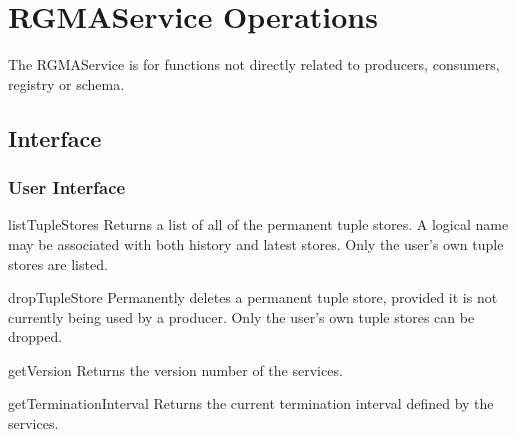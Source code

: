 \section{RGMAService Operations}\label{sec:Producer}

The RGMAService is for functions not directly related to producers, consumers,
registry or schema.

\subsection{Interface}

\subsubsection{User Interface}

\begin{method}{listTupleStores}
\desc Returns a list of all of the permanent tuple stores. A logical name may be associated with both history and latest 
stores. Only the user's own tuple 
stores are listed.
\end{method}

\begin{method}{dropTupleStore}
\OK
\desc Permanently deletes a permanent tuple store, provided it is not currently being
used by a producer. Only the user's
own tuple stores can be dropped.
\end{method}

\begin{method}{getVersion}
\desc Returns the version number of the services.
\end{method}

\begin{method}{getTerminationInterval}
\desc Returns the current termination interval defined by the services.
\end{method}
